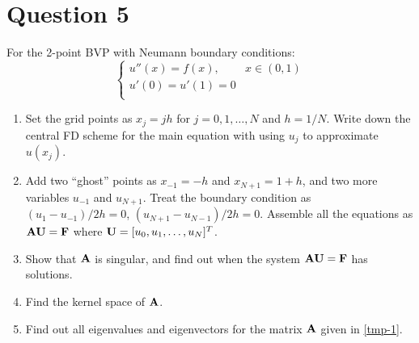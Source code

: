 \section{Question 5}
For the 2-point BVP with Neumann boundary conditions:
\[
    \begin{cases}
        u''(x) = f(x), & x\in(0, 1) \\
        u'(0) = u'(1) = 0 & \\
    \end{cases}
\]
\begin{enumerate}[label=(\alph*)]
    \item Set the grid points as $x_j=jh$ for $j=0,1,\ldots,N$ and $h=1/N$. Write down the central FD scheme for the main equation with using $u_j$ to approximate $u(x_j)$.
    \item\label{tmp-1} Add two ``ghost'' points as $x_{-1}=-h$ and $x_{N+1}=1+h$, and two more variables $u_{-1}$ and $u_{N+1}$. Treat the boundary condition as $(u_1-u_{-1})/2h=0$, $(u_{N+1}-u_{N-1})/2h=0$. Assemble all the equations as $\vb{A}\vb{U}=\vb{F}$ where $\vb{U}=[u_0, u_1, \ldots, u_N]^T$.
    \item Show that $\vb{A}$ is singular, and find out when the system $\vb{A}\vb{U}=\vb{F}$ has solutions.
    \item Find the kernel space of $\vb{A}$.
    \item Find out all eigenvalues and eigenvectors for the matrix $\vb{A}$ given in \ref{tmp-1}.
\end{enumerate}
